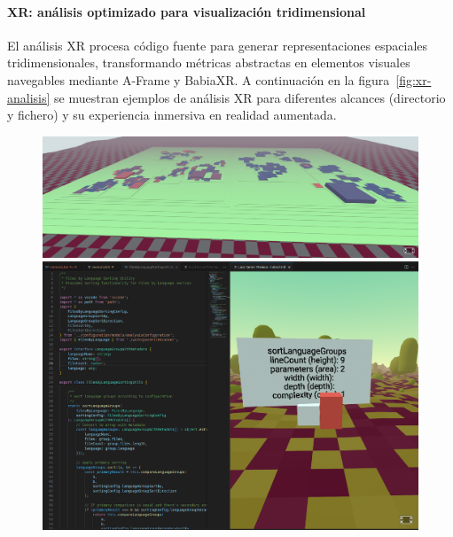 \documentclass[a4paper, 12pt]{book}
\begin{document}
\paragraph{XR: análisis optimizado para visualización tridimensional}
El análisis XR procesa código fuente para generar representaciones espaciales tridimensionales, transformando métricas abstractas en elementos visuales navegables mediante A-Frame y BabiaXR. A continuación en la figura~\ref{fig:xr-analisis} se muestran ejemplos de análisis XR para diferentes alcances (directorio y fichero) y su experiencia inmersiva en realidad aumentada.


\begin{figure}[H]
\centering
\begin{minipage}[b]{0.32\textwidth}
\centering
\includegraphics[width=\textwidth]{img/analisis-proyecto-completo.png}
\end{minipage}
\hfill
\begin{minipage}[b]{0.32\textwidth}
\centering
\includegraphics[width=\textwidth]{img/xr-fichero-analisis.png}

\end{minipage}
\end{figure}
\end{document}
